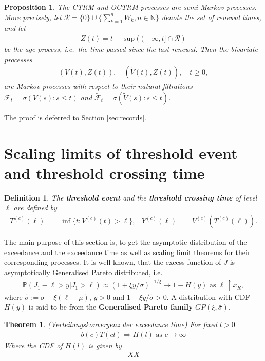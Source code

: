 \documentclass[12pt]{article}
\newtheorem{theorem}[equation]{Theorem}
\newtheorem{proposition}[equation]{Proposition}
\newtheorem{definition}[equation]{Definition}
\newcommand{\PP}{\mathbb{P}}
\newcommand{\1}{\mathbf 1}
\begin{document}
\begin{proposition}
The CTRM and OCTRM processes are semi-Markov processes. More precisely,
let $\mathcal R = \{0\} \cup \{\sum_{k=1}^n W_k, n \in \mathbb N\}$ denote the set of renewal times, and let 
\begin{align*}
Z(t) = t - \sup((-\infty, t] \cap \mathcal R)
\end{align*}
be the age process, i.e.\ the time passed since the last renewal. Then the bivariate processes 
\begin{align*}
(V(t), Z(t)), \quad (\tilde V(t), Z(t)), \quad t \ge 0,
\end{align*}
are Markov processes with respect to their natural filtrations $\mathcal F_t = \sigma(V(s): s \le t)$ and $\tilde{\mathcal F}_t = \sigma(\tilde V(s): s \le t)$. 
\end{proposition}

The proof is deferred to Section \ref{sec:records}.


\section{Scaling limits of threshold event and threshold crossing time}

\begin{definition}
The \textbf{threshold event} and the \textbf{threshold crossing time} 
of level $\ell$ are defined by
\begin{align*}
T^{(c)}(\ell) &= \inf\{t: V^{(c)}(t) > \ell\}, 
&
Y^{(c)}(\ell) &= V^{(c)}(T^{(c)}(\ell)).
\end{align*}
\end{definition}

The main purpose of this section is, to get the asymptotic distribution of the exceedance and the exceedance time as well as scaling limit theorems for their corresponding processes. It is well-known, that the excess function of $J$ is asymptotically Generalised Pareto distributed, i.e.
\begin{align*}
\PP(J_1 - \ell > y | J_1 > \ell) 
\approx (1+ \xi y / \tilde \sigma)^{-1/\xi} \rightarrow 1 - H(y) \text{ as } \ell \uparrow x_R,
\end{align*}
where $\tilde \sigma :=\sigma + \xi(\ell-\mu)$, $y>0$ and $1+\xi y/\tilde \sigma >0$. A distribution with CDF $H(y)$ is said to be from the \textbf{Generalised Pareto family}
$GP(\xi,\bar \sigma)$.\\  

\begin{theorem}(Verteilungskonvergenz der exceedance time)
For fixed $l>0$
\begin{align}
b(c) T(cl) \Rightarrow H(l) \text{ as } c \rightarrow \infty
\end{align} 
Where the CDF of $H(l)$ is given by
\begin{align*}
XX
\end{align*}
\end{theorem}
\end{document}
